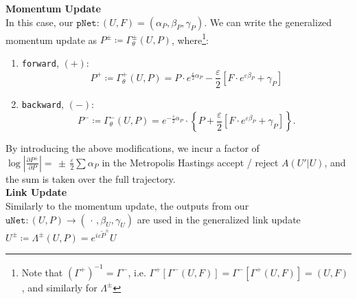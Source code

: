 \documentclass[a4paper,11pt]{article}
\begin{document}
\textbf{Momentum Update}\\
%
In this case, our $\texttt{pNet}: (U, F) = (\alpha_{P},
\beta_{P}, \gamma_{P})$.
%
We can write the generalized momentum update as $P^{\pm} \coloneqq \Gamma_{\theta}^{\pm}(U, P)$, where\footnote{Note that $\left(\Gamma^{+}\right)^{-1} = \Gamma^{-}$, i.e. $\Gamma^{+}\left[\Gamma^{-}(U, F)\right] = \Gamma^{-}\left[\Gamma^{+}(U, F)\right] = (U, F)$, and similarly for $\Lambda^{\pm}$}:
%
%
%
\begin{enumerate}
    \item \texttt{forward}, $(+)$:
    \begin{equation}
        P^{+} \coloneqq \Gamma_{\theta}^{+}(U, P) = P \cdot e^{\frac{\varepsilon}{2} \alpha_{P}} - \frac{\varepsilon}{2}\left[ F \cdot e^{\varepsilon \beta_{P}} + \gamma_{P} \right]
    \end{equation}
    \item \texttt{backward}, $(-)$:
    \begin{equation}
        P^{-} \coloneqq \Gamma_{\theta}^{-}(U, P) = e^{-\frac{\varepsilon}{2} \alpha_{P}} \cdot \left\{P + \frac{\varepsilon}{2} \left[ F \cdot e^{\varepsilon \beta_{P}} + \gamma_{P} \right] \right\}.
    \end{equation}
\end{enumerate}
%
By introducing the above modifications, we incur a factor of 
%
$\log\left|\frac{\partial P^{\pm}}{\partial P}\right| = \, \pm \, \frac{\varepsilon}{2}\sum \alpha_{P}$
%
in the Metropolis Hastings accept / reject $A(U'|U)$, and the sum is taken over the full trajectory.\\
%
\textbf{Link Update}\\
%
Similarly to the momentum update, the outputs from our 
%
$\texttt{uNet}: (U, P) \rightarrow \left(\, \cdot\,, \beta_{U}, \gamma_{U}\right)$
%
are used in the generalized link update $U^{\pm} \coloneqq \Lambda^{\pm}(U, P) = e^{i\varepsilon \tilde{P}^{\pm}} U$
%
\end{document}
